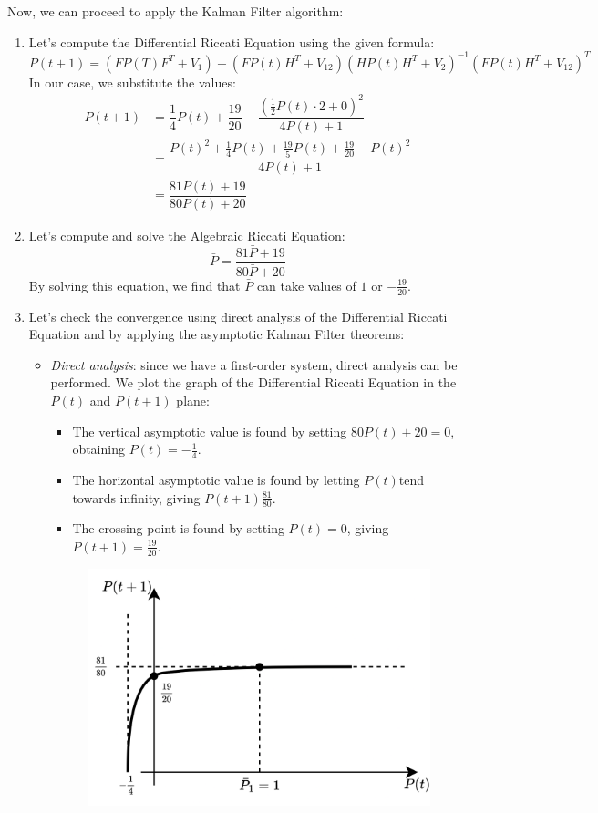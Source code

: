 \begin{example}
    Now, we can proceed to apply the Kalman Filter algorithm: 
    \begin{enumerate}
        \item Let's compute the Differential Riccati Equation using the given formula:
            \[P(t+1)=\left(FP(T)F^T+V_1\right)-\left(FP(t)H^T+V_{12}\right)\left(HP(t)H^T+V_{2}\right)^{-1}\left(FP(t)H^T+V_{12}\right)^T\]
            In our case, we substitute the values:
            \begin{align*}
                P(t+1)  &=\dfrac{1}{4}P(t)+\dfrac{19}{20}-\dfrac{\left(\frac{1}{2}P(t)\cdot 2+0\right)^2}{4P(t)+1} \\
                        &=\dfrac{P(t)^2+\frac{1}{4}P(t)+\frac{19}{5}P(t)+\frac{19}{20}-P(t)^2}{4P(t)+1} \\
                        &=\dfrac{81P(t)+19}{80P(t)+20}
            \end{align*}
        \item Let's compute and solve the Algebraic Riccati Equation:
            \[\bar{P}=\dfrac{81\bar{P}+19}{80\bar{P}+20}\]
            By solving this equation, we find that $\bar{P}$ can take values of $1$ or $-\frac{19}{20}$.
        \item Let's check the convergence using direct analysis of the Differential Riccati Equation and by applying the asymptotic Kalman Filter theorems:
            \begin{itemize}
                \item \textit{Direct analysis}: since we have a first-order system, direct analysis can be performed.
                    We plot the graph of the Differential Riccati Equation in the $P(t)$ and $P(t+1)$ plane: 
                    \begin{itemize}
                        \item The vertical asymptotic value is found by setting $80P(t)+20=0$, obtaining $P(t)=-\frac{1}{4}$. 
                        \item The horizontal asymptotic value is found by letting $P(t)$tend towards infinity, giving $P(t+1)\frac{81}{80}$. 
                        \item The crossing point is found by setting $P(t)=0$, giving $P(t+1)=\frac{19}{20}$. 
                    \end{itemize}
                    \begin{figure}[H]
                        \centering
                        \includegraphics[width=0.4\linewidth]{images/plot.png}

\end{figure}
\end{itemize}
\end{enumerate}
\end{example}
